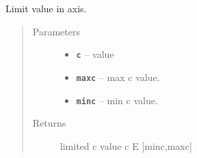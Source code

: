 \documentclass[letterpaper,10pt,english]{sphinxmanual}
\begin{document}

\begin{fulllineitems}
\label{RRtoolbox.lib:RRtoolbox.lib.plotter.limitaxis}
Limit value in axis.
\begin{quote}\begin{description}
\item[{Parameters}] \leavevmode\begin{itemize}
\item {} 
\textbf{\texttt{c}} -- value

\item {} 
\textbf{\texttt{maxc}} -- max c value.

\item {} 
\textbf{\texttt{minc}} -- min c value.

\end{itemize}

\item[{Returns}] \leavevmode
limited c value c E {[}minc,maxc{]}

\end{description}\end{quote}

\end{fulllineitems}

\end{document}
